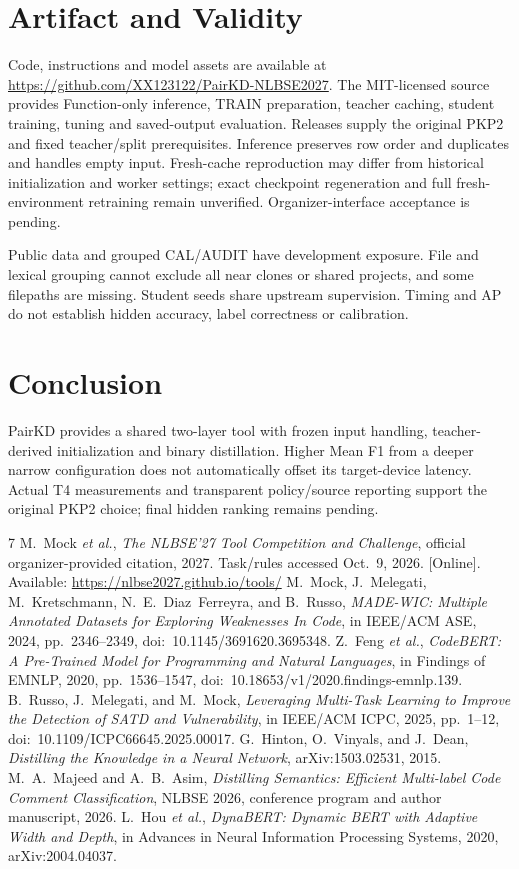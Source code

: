 \documentclass[10pt,conference]{IEEEtran}
\begin{document}
\section{Artifact and Validity}
Code, instructions and model assets are available at \url{https://github.com/XX123122/PairKD-NLBSE2027}. The MIT-licensed source provides Function-only inference, TRAIN preparation, teacher caching, student training, tuning and saved-output evaluation. Releases supply the original PKP2 and fixed teacher/split prerequisites. Inference preserves row order and duplicates and handles empty input. Fresh-cache reproduction may differ from historical initialization and worker settings; exact checkpoint regeneration and full fresh-environment retraining remain unverified. Organizer-interface acceptance is pending.

Public data and grouped CAL/AUDIT have development exposure. File and lexical grouping cannot exclude all near clones or shared projects, and some filepaths are missing. Student seeds share upstream supervision. Timing and AP do not establish hidden accuracy, label correctness or calibration.

\section{Conclusion}
PairKD provides a shared two-layer tool with frozen input handling, teacher-derived initialization and binary distillation. Higher Mean F1 from a deeper narrow configuration does not automatically offset its target-device latency. Actual T4 measurements and transparent policy/source reporting support the original PKP2 choice; final hidden ranking remains pending.

\begin{thebibliography}{7}
M.~Mock \emph{et al.}, \emph{The NLBSE'27 Tool Competition and Challenge},
official organizer-provided citation, 2027. Task/rules accessed
Oct.~9, 2026. [Online]. Available: \url{https://nlbse2027.github.io/tools/}
M.~Mock, J.~Melegati, M.~Kretschmann, N.~E.~Diaz~Ferreyra, and B.~Russo,
\emph{MADE-WIC: Multiple Annotated Datasets for Exploring Weaknesses In Code},
in IEEE/ACM ASE, 2024, pp.~2346--2349, doi:~10.1145/3691620.3695348.
Z.~Feng \emph{et al.}, \emph{CodeBERT: A Pre-Trained Model for Programming
and Natural Languages}, in Findings of EMNLP, 2020, pp.~1536--1547,
doi:~10.18653/v1/2020.findings-emnlp.139.
B.~Russo, J.~Melegati, and M.~Mock, \emph{Leveraging Multi-Task Learning
to Improve the Detection of SATD and Vulnerability}, in IEEE/ACM ICPC,
2025, pp.~1--12, doi:~10.1109/ICPC66645.2025.00017.
G.~Hinton, O.~Vinyals, and J.~Dean, \emph{Distilling the Knowledge in a
Neural Network}, arXiv:1503.02531, 2015.
M.~A.~Majeed and A.~B.~Asim, \emph{Distilling Semantics: Efficient
Multi-label Code Comment Classification}, NLBSE 2026, conference
program and author manuscript, 2026.
L.~Hou \emph{et al.}, \emph{DynaBERT: Dynamic BERT with Adaptive Width
and Depth}, in Advances in Neural Information Processing Systems,
2020, arXiv:2004.04037.
\end{thebibliography}
\end{document}
